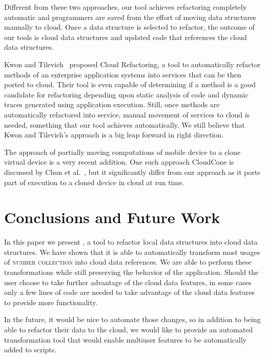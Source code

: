 \documentclass{sigplanconf}
\begin{document}
Different from these two approaches, our tool achieves refactoring completely automatic and programmers are saved from the effort of moving data structures manually to cloud. Once a data structure is selected to refactor, the outcome of our tools is cloud data structures and updated code that references the cloud data structures.

Kwon and Tilevich~\cite{kwon2013cloud} proposed Cloud Refactoring, a tool to automatically refactor methods of an enterprise application systems into services that can be then ported to cloud. Their tool is even capable of determining if a method is a good candidate for refactoring depending upon static analysis of code and dynamic traces generated using application execution. Still, once methods are automatically refactored into service, manual movement of services to cloud is needed, something that our tool achieves automatically. We still believe that Kwon and Tilevich's approach is a big leap forward in right direction.  

The approach of partially moving computations of mobile device to a clone virtual device is a very recent addition. One such approach CloudCone is discussed by Chun et al.~\cite{chun2011clonecloud}, but it significantly differ from our approach as it ports part of execution to a cloned device in cloud at run time. 


\section{Conclusions and Future Work}
\label{sec:conclusions}
In this paper we present \tool, a tool to refactor local data structures into cloud data structures.  We have shown that it is able to automatically transform most usages of \textsc{number collection} into cloud data references.  We are able to perform these transformations while still preserving the behavior of the application.  Should the user choose to take further advantage of the cloud data features, in some cases only a few lines of code are needed to take advantage of the cloud data features to provide more functionality. 

In the future, it would be nice to automate those changes, so in addition to being able to refactor their data to the cloud, we would like to provide an automated transformation tool that would enable multiuser features to be automatically added to scripts.










\end{document}
